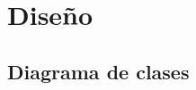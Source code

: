 \setcounter{chapter}{6}
\setcounter{section}{0}
\setcounter{subsection}{0}
\chapter{Diseño}
\section{Diagrama de clases}

\newpage
